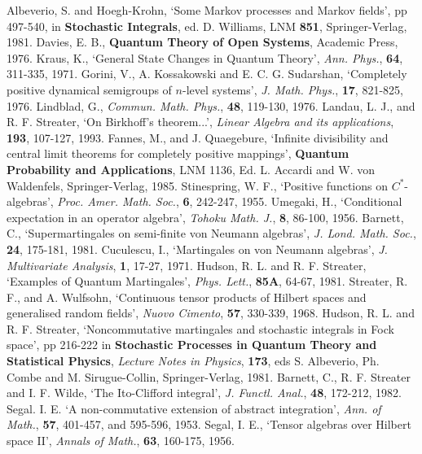  Albeverio, S. and Hoegh-Krohn, `Some Markov processes
and Markov fields', pp 497-540, in {\bf Stochastic Integrals},
ed. D. Williams, LNM {\bf 851}, Springer-Verlag, 1981.
 Davies, E. B., {\bf Quantum Theory of Open Systems},
Academic Press, 1976.
 Kraus, K., `General State Changes in Quantum Theory',
{\em Ann. Phys.}, {\bf 64}, 311-335, 1971.
 Gorini, V., A. Kossakowski and E. C. G. Sudarshan,
`Completely positive dynamical semigroups of $n$-level systems',
{\em J. Math. Phys.}, {\bf 17}, 821-825, 1976.
 Lindblad, G., {\em Commun. Math. Phys.}, {\bf 48},
119-130, 1976.
 Landau, L. J., and R. F. Streater, `On Birkhoff's
theorem...', {\em Linear Algebra and its applications}, {\bf 193},
107-127, 1993.
 Fannes, M., and J. Quaegebure, `Infinite divisibility
and central limit theorems for completely positive mappings', {\bf Quantum
Probability and Applications}, LNM 1136, Ed. L. Accardi and W. von
Waldenfels, Springer-Verlag, 1985.
 Stinespring, W. F., `Positive functions on
$C^*$-algebras', {\em Proc. Amer. Math. Soc.}, {\bf 6}, 242-247, 1955.
 Umegaki, H., `Conditional expectation in an operator
algebra', {\em Tohoku Math. J.}, {\bf 8}, 86-100, 1956.
 Barnett, C., `Supermartingales on semi-finite von
Neumann algebras', {\em J. Lond. Math. Soc.}, {\bf 24}, 175-181, 1981.
 Cuculescu, I., `Martingales on von Neumann algebras',
{\em J. Multivariate Analysis}, {\bf 1}, 17-27, 1971.
 Hudson, R. L. and R. F. Streater, `Examples of
Quantum Martingales', {\em Phys. Lett.}, {\bf 85A}, 64-67, 1981.
 Streater, R. F., and A. Wulfsohn, `Continuous tensor
products of Hilbert spaces and generalised random fields', {\em Nuovo Cimento},
{\bf 57}, 330-339, 1968.
 Hudson, R. L. and R. F. Streater, `Noncommutative
martingales and
stochastic integrals in Fock space', pp 216-222 in {\bf Stochastic Processes
in Quantum Theory and Statistical Physics}, {\em Lecture Notes in Physics},
{\bf 173}, eds S. Albeverio, Ph. Combe and M. Sirugue-Collin,
Springer-Verlag, 1981.
 Barnett, C., R. F. Streater and I. F. Wilde, `The
Ito-Clifford integral', {\em J. Functl. Anal.}, {\bf 48}, 172-212, 1982.
 Segal. I. E. `A non-commutative extension of abstract
integration', {\em Ann. of Math.}, {\bf 57}, 401-457, and 595-596, 1953.
 Segal, I. E., `Tensor algebras over Hilbert space II',
{\em Annals of Math.}, {\bf 63}, 160-175, 1956.
